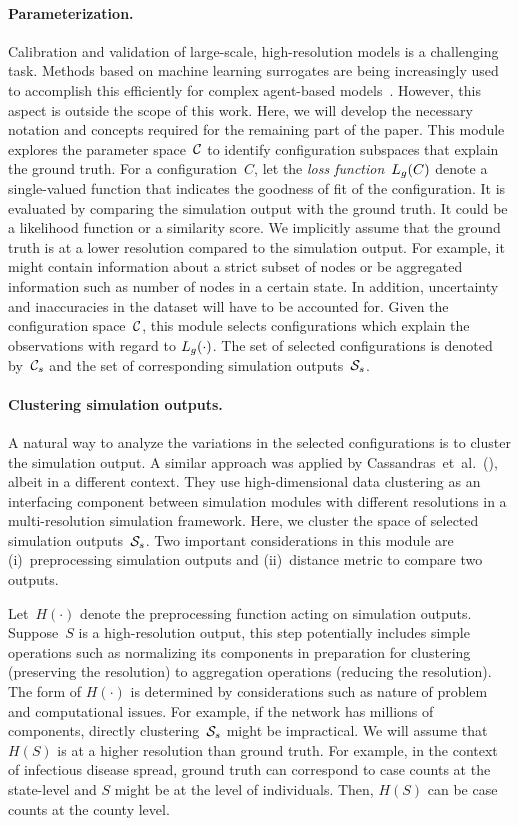 \documentclass{article}
\begin{document}
\paragraph{Parameterization.} 
Calibration and validation of large-scale, high-resolution models is a
challenging task. Methods based on machine learning surrogates are being
increasingly used to accomplish this efficiently for complex agent-based
models~\cite{lamperti2018agent}. However, this aspect is outside the
scope of this work. Here, we will develop the necessary notation and
concepts required for the remaining part of the paper. This module explores
the parameter space~$\mathcal{C}$ to identify configuration subspaces that
explain the ground truth. For a configuration~$C$, let the \emph{loss
function}~$L_g(C)$ denote a single-valued function that indicates
the goodness of fit of the configuration. It is evaluated by comparing the
simulation output with the ground truth. It could be a likelihood function
or a similarity score. We implicitly assume that the ground truth is at a
lower resolution compared to the simulation output. For example, it might
contain information about a strict subset of nodes or be aggregated
information such as number of nodes in a certain state. In addition,
uncertainty and inaccuracies in the dataset will have to be accounted for.
Given the configuration space~$\mathcal{C}$, this module selects
configurations which explain the observations with regard to
$L_g(\cdot)$. The set of selected configurations is denoted
by~$\mathcal{C}_s$ and the set of corresponding simulation
outputs~$\mathcal{S}_s$.
\paragraph{Clustering simulation outputs.}
A natural way to analyze the variations in the selected configurations is
to cluster the simulation output. A similar approach was applied by
Cassandras~et~al.~(\citeyear{cassandras2000clustering}), albeit in a
different context. They use high-dimensional data clustering as an
interfacing component between simulation modules with different resolutions
in a multi-resolution simulation framework. Here, we cluster the space of
selected simulation outputs~$\mathcal{S}_s$. Two important
considerations in this module are (i)~preprocessing simulation outputs and
(ii)~distance metric to compare two outputs. 

Let~$H(\cdot)$ denote the preprocessing function acting on simulation
outputs. Suppose~$S$ is a high-resolution output, this step potentially
includes simple operations such as normalizing its components in
preparation for clustering (preserving the resolution) to aggregation
operations (reducing the resolution). The form of $H(\cdot)$ is determined
by considerations such as nature of problem and computational issues. For
example, if the network has millions of components, directly
clustering~$\mathcal{S}_s$ might be impractical.  We will assume that
$H(S)$ is at a higher resolution than ground truth.  For example, in the
context of infectious disease spread, ground truth can correspond to case
counts at the state-level and $S$ might be at the level of individuals.
Then, $H(S)$ can be case counts at the county level.
\end{document}
